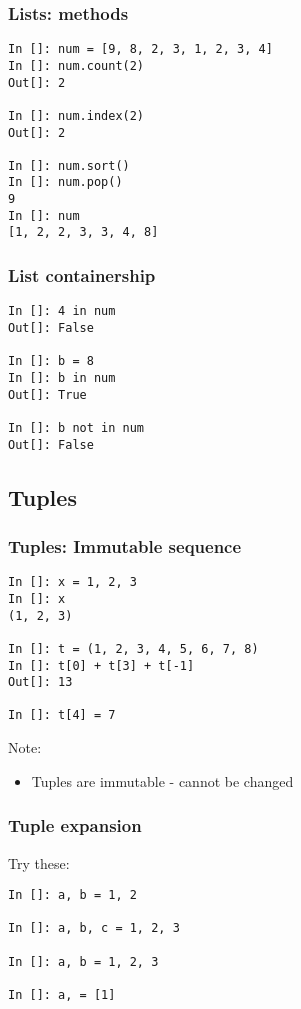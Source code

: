 \documentclass[14pt,compress]{beamer}
\begin{document}
\begin{frame}[fragile]
  \frametitle{Lists: methods}
  \begin{lstlisting}
In []: num = [9, 8, 2, 3, 1, 2, 3, 4]
In []: num.count(2)
Out[]: 2

In []: num.index(2)
Out[]: 2

In []: num.sort()
In []: num.pop()
9
In []: num
[1, 2, 2, 3, 3, 4, 8]
  \end{lstlisting}
\end{frame}



\begin{frame}[fragile]
\frametitle{List containership}
\begin{lstlisting}
In []: 4 in num
Out[]: False

In []: b = 8
In []: b in num
Out[]: True

In []: b not in num
Out[]: False
\end{lstlisting}
\end{frame}

\subsection{Tuples}
\begin{frame}[fragile]
\frametitle{Tuples: Immutable sequence}
\begin{lstlisting}
In []: x = 1, 2, 3
In []: x
(1, 2, 3)

In []: t = (1, 2, 3, 4, 5, 6, 7, 8)
In []: t[0] + t[3] + t[-1]
Out[]: 13

In []: t[4] = 7
\end{lstlisting}
\pause
\begin{block}{Note:}
\begin{itemize}
  \item Tuples are immutable - cannot be changed
\end{itemize}
\end{block}

\end{frame}

\begin{frame}[fragile]
  \frametitle{Tuple expansion}
  Try these:
\begin{lstlisting}
In []: a, b = 1, 2

In []: a, b, c = 1, 2, 3

In []: a, b = 1, 2, 3

In []: a, = [1]
\end{lstlisting}
\end{frame}
\end{document}
